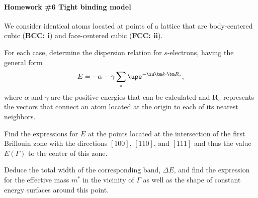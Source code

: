 
\paragraph{Homework \#6 Tight binding model}

\begin{problem}
  We consider identical atoms located at points of a lattice that are
  body-centered cubic (\textbf{BCC: i}) and face-centered cubic
  (\textbf{FCC: ii}).
  \begin{enumext}
    \item For each case, determine the dispersion relation for $s$-electrons,
    having the general form
    \[
      E = -\alpha - \gamma \sum_s \upe^{-\iu \bm k \cdot \bm R_s},
    \]
    where $\alpha$ and $\gamma$ are the positive energies that can be calculated
    and $\mathbf R_s$ represents the vectors that connect an atom located at the
    origin to each of its nearest neighbors.
    \item Find the expressions for $E$ at the points located at the intersection
    of the first Brillouin zone with the directions $[100]$, $[110]$,
    and $[111]$ and thus the value $E(\Gamma)$ to the center of this zone.
    \item Deduce the total width of the corresponding band, $\Delta E$, and find
    the expression for the effective mass $m^*$ in the vicinity of $\Gamma$ as
    well as the shape of constant energy surfaces around this point.
  \end{enumext}
\end{problem}
